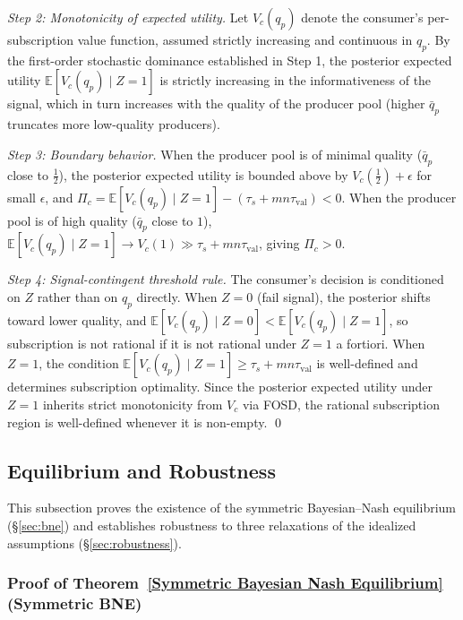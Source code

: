 \textit{Step 2: Monotonicity of expected utility.} Let $V_c(q_p)$ denote the consumer's per-subscription value function, assumed strictly increasing and continuous in $q_p$. By the first-order stochastic dominance established in Step 1, the posterior expected utility $\mathbb{E}[V_c(q_p) \mid Z = 1]$ is strictly increasing in the informativeness of the signal, which in turn increases with the quality of the producer pool (higher $\bar{q}_p$ truncates more low-quality producers).

\textit{Step 3: Boundary behavior.} When the producer pool is of minimal quality ($\bar{q}_p$ close to $\frac{1}{2}$), the posterior expected utility is bounded above by $V_c(\frac{1}{2}) + \epsilon$ for small $\epsilon$, and $\Pi_c = \mathbb{E}[V_c(q_p) \mid Z = 1] - (\tau_s + mn\tau_{\text{val}}) < 0$. When the producer pool is of high quality ($\bar{q}_p$ close to $1$), $\mathbb{E}[V_c(q_p) \mid Z = 1] \to V_c(1) \gg \tau_s + mn\tau_{\text{val}}$, giving $\Pi_c > 0$.

\textit{Step 4: Signal-contingent threshold rule.} The consumer's decision is conditioned on $Z$ rather than on $q_p$ directly. When $Z = 0$ (fail signal), the posterior shifts toward lower quality, and $\mathbb{E}[V_c(q_p) \mid Z = 0] < \mathbb{E}[V_c(q_p) \mid Z = 1]$, so subscription is not rational if it is not rational under $Z = 1$ a fortiori. When $Z = 1$, the condition $\mathbb{E}[V_c(q_p) \mid Z = 1] \geq \tau_s + mn\tau_{\text{val}}$ is well-defined and determines subscription optimality. Since the posterior expected utility under $Z = 1$ inherits strict monotonicity from $V_c$ via FOSD, the rational subscription region is well-defined whenever it is non-empty. \qed


\subsection{Equilibrium and Robustness}
\label{app:eq_robustness}

This subsection proves the existence of the symmetric Bayesian--Nash equilibrium (\S\ref{sec:bne}) and establishes robustness to three relaxations of the idealized assumptions (\S\ref{sec:robustness}).

\subsubsection{Proof of Theorem~\ref{Symmetric Bayesian Nash Equilibrium} (Symmetric BNE)}
\label{app:proof_bne}

